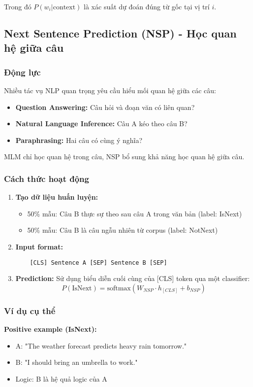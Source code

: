 Trong đó $P(w_i | \text{context})$ là xác suất dự đoán đúng từ gốc tại vị trí $i$.

\subsection{Next Sentence Prediction (NSP) - Học quan hệ giữa câu}
\label{ssec:nsp}

\subsubsection{Động lực}
Nhiều tác vụ NLP quan trọng yêu cầu hiểu mối quan hệ giữa các câu:
\begin{itemize}
    \item \textbf{Question Answering:} Câu hỏi và đoạn văn có liên quan?
    \item \textbf{Natural Language Inference:} Câu A kéo theo câu B?
    \item \textbf{Paraphrasing:} Hai câu có cùng ý nghĩa?
\end{itemize}

MLM chỉ học quan hệ trong câu, NSP bổ sung khả năng học quan hệ giữa câu.

\subsubsection{Cách thức hoạt động}
\begin{enumerate}
    \item \textbf{Tạo dữ liệu huấn luyện:}
    \begin{itemize}
        \item 50\% mẫu: Câu B thực sự theo sau câu A trong văn bản (label: IsNext)
        \item 50\% mẫu: Câu B là câu ngẫu nhiên từ corpus (label: NotNext)
    \end{itemize}
    
    \item \textbf{Input format:}
    \begin{verbatim}
    [CLS] Sentence A [SEP] Sentence B [SEP]
    \end{verbatim}
    
    \item \textbf{Prediction:} Sử dụng biểu diễn cuối cùng của [CLS] token qua một classifier:
    $$ P(\text{IsNext}) = \text{softmax}(W_{NSP} \cdot h_{[CLS]} + b_{NSP}) $$
\end{enumerate}

\subsubsection{Ví dụ cụ thể}
\textbf{Positive example (IsNext):}
\begin{itemize}
    \item A: "The weather forecast predicts heavy rain tomorrow."
    \item B: "I should bring an umbrella to work."
    \item Logic: B là hệ quả logic của A
\end{itemize}

